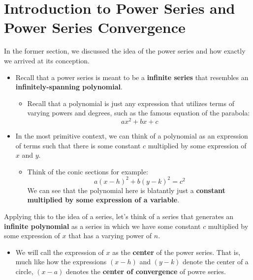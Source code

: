\section{Introduction to Power Series and Power Series Convergence}%
\label{sec:label}
In the former section, we discussed the idea of the
power series and how exactly we arrived at its conception.
\begin{itemize}
  \item Recall that a power series is meant to be a
        \textbf{infinite series} that resembles
        an \textbf{infinitely-spanning polynomial}.
        \begin{itemize}
          \item Recall that a polynomial is just any
                expression that utilizes terms of
                varying powers and degrees, such as the
                famous equation of the parabola:
                \[ ax^{2} + bx + c \]
        \end{itemize}
  \item In the most primitive context, we can think
        of a polynomial as an expression of terms
        such that there is some constant $ c $
        multiplied by some expression of $ x $ and $ y $.
        \begin{itemize}
          \item Think of the conic sections for example:
                \[ a(x-h)^{2} + b(y-k)^{2} = c^{2} \]
                We can see that the polynomial here
                is blatantly just a \textbf{constant
                multiplied by some expression of a variable}.
        \end{itemize}

\end{itemize}
Applying this to the idea of a series, let's think
of a series that generates an \textbf{infinite polynomial}
as a series in which we have some constant $ c $
multiplied by some expression of $ x $ that has a
varying power of $ n $.
\begin{itemize}
  \item We will call the expression of $ x $ as
        the \textbf{center} of the power series.
        That is, much like how the expressions
        $ (x-h)$ and $ (y-k)$ denote the
        center of a circle, $ (x-a)$ denotes
        the \textbf{center of convergence} of
        powre series.
\end{itemize}


